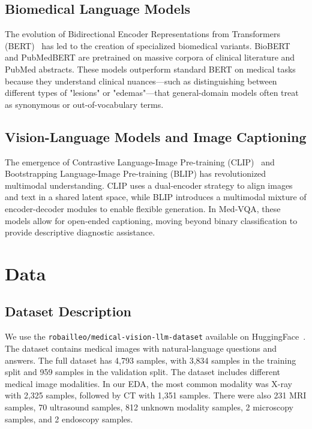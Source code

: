\documentclass{article}
\begin{document}
\subsection{Biomedical Language Models}
The evolution of Bidirectional Encoder Representations from Transformers (BERT)~\cite{devlin2018bert} has led to the creation of specialized biomedical variants. BioBERT~\cite{lee2020biobert} and PubMedBERT are pretrained on massive corpora of clinical literature and PubMed abstracts. These models outperform standard BERT on medical tasks because they understand clinical nuances—such as distinguishing between different types of "lesions" or "edemas"—that general-domain models often treat as synonymous or out-of-vocabulary terms.

\subsection{Vision-Language Models and Image Captioning}
The emergence of Contrastive Language-Image Pre-training (CLIP)~\cite{radford2021clip} and Bootstrapping Language-Image Pre-training (BLIP) has revolutionized multimodal understanding. CLIP uses a dual-encoder strategy to align images and text in a shared latent space, while BLIP introduces a multimodal mixture of encoder-decoder modules to enable flexible generation. In Med-VQA, these models allow for open-ended captioning, moving beyond binary classification to provide descriptive diagnostic assistance.

\section{Data}


\subsection{Dataset Description}

We use the \texttt{robailleo/medical-vision-llm-dataset} available on
HuggingFace~\cite{robailleo-medical-vision-llm-dataset}. The dataset contains
medical images with natural-language questions and answers. The full dataset has
4,793 samples, with 3,834 samples in the training split and 959 samples in the
validation split. The dataset includes different medical image modalities. In
our EDA, the most common modality was X-ray with 2,325 samples, followed by CT
with 1,351 samples. There were also 231 MRI samples, 70 ultrasound samples, 812
unknown modality samples, 2 microscopy samples, and 2 endoscopy samples.
\end{document}
